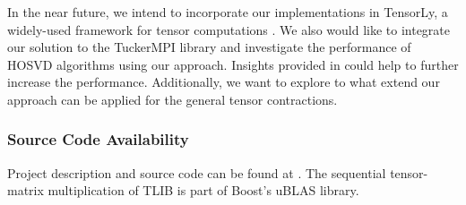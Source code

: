 In the near future, we intend to incorporate our implementations in TensorLy, a widely-used framework for tensor computations \cite{cohen:2022:tensor.computations, kossaifi:2019:tensorly}.
We also would like to integrate our solution to the TuckerMPI library \cite{ballard:2020:tuckermpi} and investigate the performance of HOSVD algorithms using our approach.
Insights provided in \cite{li:2015:input} could help to further increase the performance.
Additionally, we want to explore to what extend our approach can be applied for the general tensor contractions.

\subsubsection{Source Code Availability}
Project description and source code can be found at .
The sequential tensor-matrix multiplication of TLIB is part of Boost's uBLAS library.